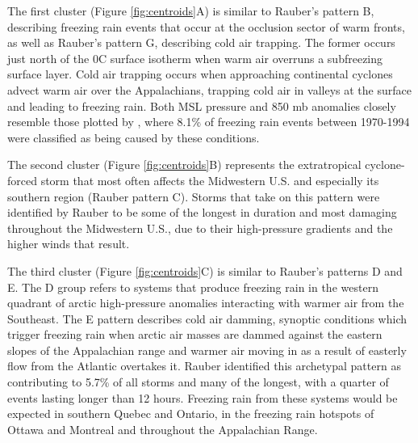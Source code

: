 \documentclass[twocol]{ametsoc}
\begin{document}
The first cluster (Figure \ref{fig:centroids}A) is similar to Rauber's pattern B, describing freezing rain events that occur at the occlusion sector of warm fronts, as well as Rauber's pattern G, describing cold air trapping. The former occurs just north of the 0\degree C surface isotherm when warm air overruns a subfreezing surface layer. Cold air trapping occurs when approaching continental cyclones advect warm air over the Appalachians, trapping cold air in valleys at the surface and leading to freezing rain. Both MSL pressure and 850 mb anomalies closely resemble those plotted by \citet{rauber2001synoptic}, where  8.1\% of freezing rain events between 1970-1994 were classified as being caused by these conditions. 

The second cluster (Figure \ref{fig:centroids}B) represents the extratropical cyclone-forced storm that most often affects the Midwestern U.S. and especially its southern region (Rauber pattern C). Storms that take on this pattern were identified by Rauber to be some of the longest in duration and most damaging throughout the Midwestern U.S., due to their high-pressure gradients and the higher winds that result. 

The third cluster (Figure \ref{fig:centroids}C) is similar to Rauber's patterns D and E. The D group refers to systems that produce freezing rain in the western quadrant of arctic high-pressure anomalies interacting with warmer air from the Southeast. The E pattern describes cold air damming, synoptic conditions which trigger freezing rain when arctic air masses are dammed against the eastern slopes of the Appalachian range and warmer air moving in as a result of easterly flow from the Atlantic overtakes it. Rauber identified this archetypal pattern as contributing to 5.7\% of all storms and many of the longest, with a quarter of events lasting longer than 12 hours. Freezing rain from these systems would be expected in southern Quebec and Ontario, in the freezing rain hotspots of Ottawa and Montreal and throughout the Appalachian Range. 
\end{document}
